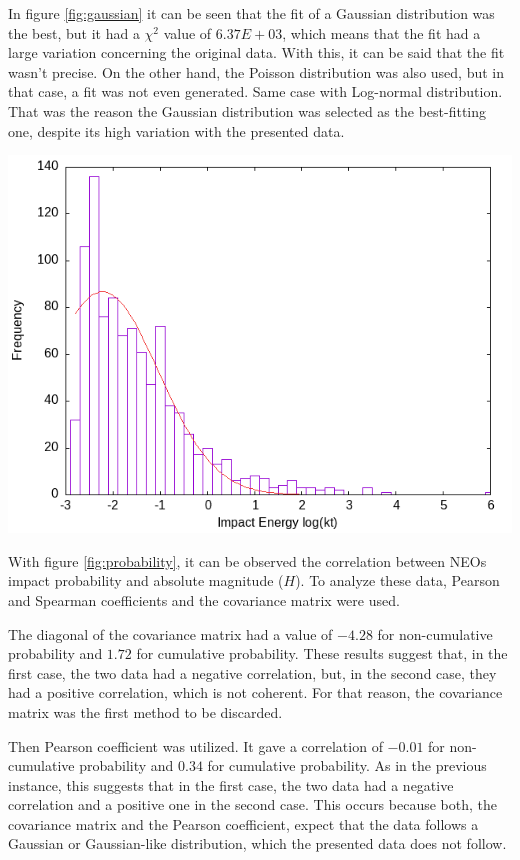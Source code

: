 \documentclass[a1,portrait]{a1poster}
\begin{document}
\begin{multicols}{2}
In figure \ref{fig:gaussian} it can be seen that the fit of a Gaussian distribution was the best,
but it had a $\chi^2$ value of $6.37E+03$, which means that the fit had a large variation concerning
the original data. With this, it can be said that the fit wasn't precise. On the other hand, the Poisson
distribution was also used, but in that case, a fit was not even generated. Same case with Log-normal
distribution. That was the reason the Gaussian distribution was selected as the best-fitting
one, despite its high variation with the presented data.

\begin{center}\vspace{1cm}
    \includegraphics[width=0.5\linewidth]{fit}
    \label{fig:gaussian}
\end{center}\vspace{1cm}

With figure \ref{fig:probability}, it can be observed the correlation between NEOs impact probability
and absolute magnitude ($H$). To analyze these data, Pearson and Spearman coefficients and the
covariance matrix were used. 

The diagonal of the covariance matrix had a value of $-4.28$ for non-cumulative probability and $1.72$
for cumulative probability. These results suggest that, in the first case, the two data had a negative
correlation, but, in the second case, they had a positive correlation, which is not coherent. For that
reason, the covariance matrix was the first method to be discarded.

Then Pearson coefficient was utilized. It gave a correlation of $-0.01$ for non-cumulative
probability and $0.34$ for cumulative probability. As in the previous instance, this suggests that
in the first case, the two data had a negative correlation and a positive one in the second case. This
occurs because both, the covariance matrix and the Pearson coefficient, expect that the data follows
a Gaussian or Gaussian-like distribution, which the presented data does not follow.


\end{multicols}
\end{document}

